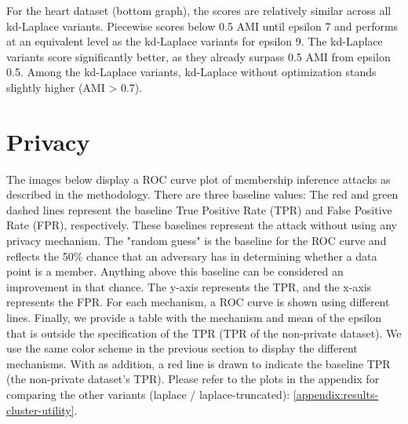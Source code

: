 For the heart dataset (bottom graph), the scores are relatively similar across all kd-Laplace variants. Piecewise scores below 0.5 AMI until epsilon 7 and performs at an equivalent level as the kd-Laplace variants for epsilon 9. The kd-Laplace variants score significantly better, as they already surpass 0.5 AMI from epsilon 0.5. Among the kd-Laplace variants, kd-Laplace without optimization stands slightly higher (AMI > 0.7).

\newpage
\section{Privacy}
The images below display a ROC curve plot of membership inference attacks as described in the methodology.
There are three baseline values: The red and green dashed lines represent the baseline True Positive Rate (TPR) and False Positive Rate (FPR), respectively. These baselines represent the attack without using any privacy mechanism. The "random guess" is the baseline for the ROC curve and reflects the 50\% chance that an adversary has in determining whether a data point is a member. Anything above this baseline can be considered an improvement in that chance.
The y-axis represents the TPR, and the x-axis represents the FPR. For each mechanism, a ROC curve is shown using different lines.
Finally, we provide a table with the mechanism and mean of the epsilon that is outside the specification of the TPR (TPR of the non-private dataset). \newline
We use the same color scheme in the previous section to display the different mechanisms.
With as addition, a red line is drawn to indicate the baseline TPR (the non-private dataset's TPR). \newline
Please refer to the plots in the appendix for comparing the other variants (laplace / laplace-truncated): \ref{appendix:results-cluster-utility}.

\newpage

